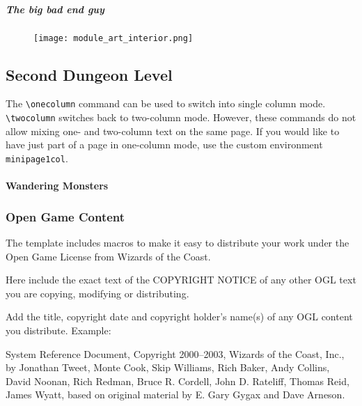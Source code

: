 \documentclass[a4paper]{module}
\begin{document}
\subsubsection{The big bad end guy}

\begin{figure}[h]
\texttt{[image: module\_art\_interior.png]}
\end{figure}


\begin{minipage1col}[b]
\part{Second Dungeon Level}

The \texttt{\textbackslash onecolumn} command can be used to switch into single column mode. \texttt{\textbackslash twocolumn} switches back to two-column mode. However,
these commands do not allow mixing one- and two-column text on the same page. If you would like to have just part of a page in one-column mode, use the custom
environment \texttt{minipage1col}.

\subsection{Wandering Monsters}

\lipsum
\end{minipage1col}

\lipsum

\section{Open Game Content}

The template includes macros to make it easy to distribute your work under the Open Game License from Wizards of the Coast.

\begin{ogl}
\item Here include the exact text of the COPYRIGHT NOTICE of any other OGL text you are copying, modifying or distributing.
\item Add the title, copyright date and copyright holder's name(s) of any OGL content you distribute. Example:
\item System Reference Document, Copyright 2000--2003, Wizards of the Coast, Inc., by Jonathan Tweet, Monte Cook, Skip Williams, Rich Baker, Andy Collins,
David Noonan, Rich Redman, Bruce R. Cordell, John D. Rateliff, Thomas Reid, James Wyatt, based on original material by E. Gary Gygax and Dave Arneson.
\end{ogl}
\end{document}

